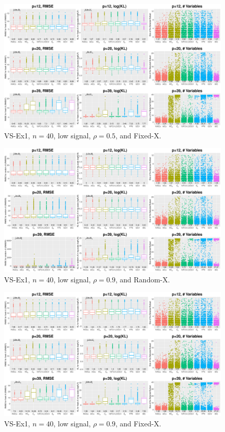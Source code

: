 \begin{figure}[!ht]
\centering
\includegraphics[width=\textwidth]{figures/supplement/fixedx_VS-Ex1_n40_lsnr_rho05.eps}
\caption{VS-Ex1, $n=40$, low signal, $\rho=0.5$, and Fixed-X.}
\end{figure}
\clearpage
\begin{figure}[!ht]
\centering
\includegraphics[width=\textwidth]{figures/supplement/randomx_VS-Ex1_n40_lsnr_rho09.eps}
\caption{VS-Ex1, $n=40$, low signal, $\rho=0.9$, and Random-X.}
\end{figure}
\begin{figure}[!ht]
\centering
\includegraphics[width=\textwidth]{figures/supplement/fixedx_VS-Ex1_n40_lsnr_rho09.eps}
\caption{VS-Ex1, $n=40$, low signal, $\rho=0.9$, and Fixed-X.}
\end{figure}
